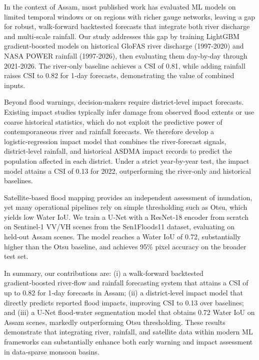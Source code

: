 \documentclass[conference]{IEEEtran}
\begin{document}
In the context of Assam, most published work has evaluated ML models on limited temporal windows or on regions with richer gauge networks, leaving a gap for robust, walk‑forward backtested forecasts that integrate both river discharge and multi‑scale rainfall. Our study addresses this gap by training LightGBM gradient‑boosted models on historical GloFAS river discharge (1997‑2020) and NASA POWER rainfall (1997‑2026), then evaluating them day‑by‑day through 2021‑2026. The river‑only baseline achieves a CSI of 0.81, while adding rainfall raises CSI to 0.82 for 1‑day forecasts, demonstrating the value of combined inputs.

Beyond flood warnings, decision‑makers require district‑level impact forecasts. Existing impact studies typically infer damage from observed flood extents or use coarse historical statistics, which do not exploit the predictive power of contemporaneous river and rainfall forecasts. We therefore develop a logistic‑regression impact model that combines the river‑forecast signals, district‑level rainfall, and historical ASDMA impact records to predict the population affected in each district. Under a strict year‑by‑year test, the impact model attains a CSI of 0.13 for 2022, outperforming the river‑only and historical baselines.

Satellite‑based flood mapping provides an independent assessment of inundation, yet many operational pipelines rely on simple thresholding such as Otsu, which yields low Water IoU. We train a U‑Net with a ResNet‑18 encoder from scratch on Sentinel‑1 VV/VH scenes from the Sen1Floods11 dataset, evaluating on held‑out Assam scenes. The model reaches a Water IoU of 0.72, substantially higher than the Otsu baseline, and achieves 95\% pixel accuracy on the broader test set.

In summary, our contributions are: (i) a walk‑forward backtested gradient‑boosted river‑flow and rainfall forecasting system that attains a CSI of up to 0.82 for 1‑day forecasts in Assam; (ii) a district‑level impact model that directly predicts reported flood impacts, improving CSI to 0.13 over baselines; and (iii) a U‑Net flood‑water segmentation model that obtains 0.72 Water IoU on Assam scenes, markedly outperforming Otsu thresholding. These results demonstrate that integrating river, rainfall, and satellite data within modern ML frameworks can substantially enhance both early warning and impact assessment in data‑sparse monsoon basins.
\end{document}
